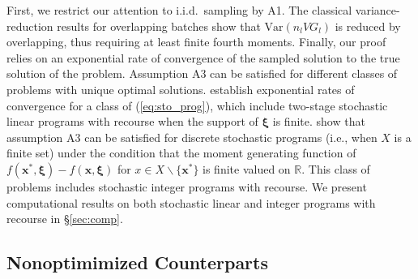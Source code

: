 \documentclass[12pt]{article}
\newcommand{\R}{{\mathbb{R}}}
\newcommand{\e}[1]{\mathbb{E} \left[ #1 \right]
}
\newcommand{\var}[1]{\mathrm{Var} \left( #1 \right)}
\newcommand{\x}{\mathbf{x}}
\newcommand{\xs}{\x^*}
\newcommand{\xit}{\boldsymbol{\xi}}
\begin{document}
First, we restrict our attention to i.i.d.\ sampling by A1.
The classical variance-reduction results for overlapping batches show that $\var{n_l VG_l}$ is reduced by overlapping, thus requiring at least finite fourth moments. 
Finally, our proof relies on an exponential rate of convergence of the sampled solution to the true solution of the problem.  
Assumption A3 can be satisfied for different classes of problems with unique optimal solutions.  
\citet{shapiro2000rate} establish exponential rates of convergence for a class of (\ref{eq:sto_prog}), which include two-stage stochastic linear programs with recourse when the support of $\xit$ is finite.   
\citet{kleywegt2002sample} show that assumption A3 can be satisfied for discrete stochastic programs (i.e., when $X$ is a finite set) under the condition that the moment generating function of $f(\xs,\xit) - f(\x,\xit)$ for $x \in X \backslash \{\xs\}$ is finite valued on $\R$.  
This class of problems includes stochastic integer programs with recourse.
  We present computational results on both stochastic linear and integer programs with recourse in \S \ref{sec:comp}.





\subsection{Nonoptimimized Counterparts}
\label{subsec:nonO}
\end{document}
